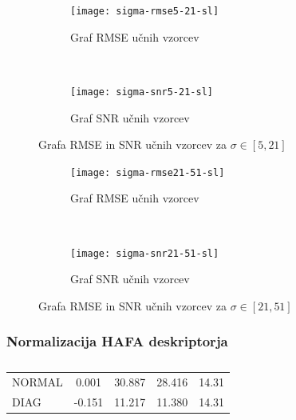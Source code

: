 \begin{figure}[!htb]
	\centering
	\begin{subfigure}[t]{0.45\columnwidth}
		\texttt{[image: sigma-rmse5-21-sl]}
		\caption{Graf RMSE  učnih vzorcev}
		\label{fig:sigma-rmse5-21}
	\end{subfigure}
	~
	\begin{subfigure}[t]{0.45\columnwidth}
		\texttt{[image: sigma-snr5-21-sl]}
		\caption{Graf SNR  učnih vzorcev}
		\label{fig:sigma-snr5-21}
	\end{subfigure}
	\caption{Grafa RMSE in SNR učnih vzorcev za \mbox{$\sigma \in [5,21]$}}
	\label{fig:sigma5-21}
\end{figure}



\begin{figure}[!htb]
	\centering
	\begin{subfigure}[t]{0.45\columnwidth}
		\texttt{[image: sigma-rmse21-51-sl]}
		\caption{Graf RMSE učnih vzorcev}
		\label{fig:sigma-rmse21-51}
	\end{subfigure}
	~
	\begin{subfigure}[t]{0.45\columnwidth}
		\texttt{[image: sigma-snr21-51-sl]}
		\caption{Graf SNR  učnih vzorcev}
		\label{fig:sigma-snr21-51}
	\end{subfigure}
	\caption{Grafa RMSE in SNR učnih vzorcev za \mbox{$\sigma \in [21,51]$}}
	\label{fig:sigma21-51}
\end{figure}






\subsubsection{Normalizacija HAFA deskriptorja}

\begin{table}[!htb]
	\centering
	\begin{tabular}{l S[table-format=1.3] S[table-format=2.3] S[table-format=2.3] S[table-format=2.2]}
		\toprule
		 &  &  &  & \\
		\midrule%
		NORMAL & 0.001 & 30.887 & 28.416 & 14.31 \\
		DIAG & -0.151 & 11.217 & 11.380 & 14.31 \\
		\bottomrule
	\end{tabular}
	\caption[]{}
	\label{tab:hafa-norm}
\end{table}


